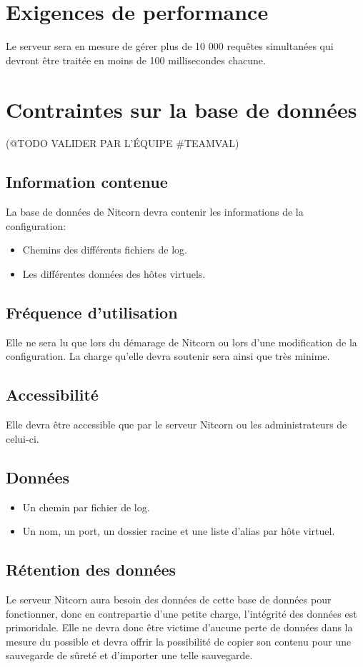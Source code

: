 \documentclass{scrreprt}
\begin{document}
\section{Exigences de performance} Le serveur sera en mesure de gérer plus de 10 000 requêtes simultanées qui devront être traitée en moins de 100 millisecondes chacune. 
\section{Contraintes sur la base de données}
(@TODO VALIDER PAR L'ÉQUIPE #TEAMVAL)
\subsection{Information contenue}
La base de données de Nitcorn devra contenir les informations de la configuration:
\begin{itemize}
	\item Chemins des différents fichiers de log.
	\item Les différentes données des hôtes virtuels.
\end{itemize}
\subsection{Fréquence d'utilisation}
Elle ne sera lu que lors du démarage de Nitcorn ou lors d'une modification de la configuration.
La charge qu'elle devra soutenir sera ainsi que très minime.
\subsection{Accessibilité}
Elle devra être accessible que par le serveur Nitcorn ou les administrateurs de celui-ci.
\subsection{Données}
\begin{itemize}
	\item Un chemin par fichier de log.
	\item Un nom, un port, un dossier racine et une liste d'alias par hôte virtuel.
\end{itemize}
\subsection{Rétention des données}
Le serveur Nitcorn aura besoin des données de cette base de données pour fonctionner, donc en contrepartie d'une petite charge, l'intégrité des données est primoridale. Elle ne devra donc être victime d'aucune perte de données dans la mesure du possible et devra offrir la possibilité de copier son contenu pour une sauvegarde de sûreté et d'importer une telle sauvegarde.
\end{document}

